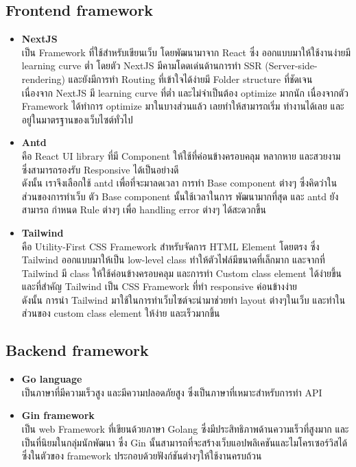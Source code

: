 \documentclass[12pt,oneside,openright,a4paper]{cpe-thai-project}
\begin{document}
\subsection{Frontend framework}
\begin{itemize}
  \item \textbf{NextJS} \\
\hspace*{1cm} เป็น Framework ที่ใช้สำหรับเขียนเว็บ โดยพัฒนามาจาก React ซึ่ง ออกแบบมาให้ใช้งานง่ายมี learning curve ต่ำ โดยตัว NextJS มีคามโดดเด่นด้านการทำ SSR (Server-side-rendering) และยังมีการทำ Routing ที่เข้าใจได้ง่ายมี Folder structure ที่ชัดเจน \\
\hspace*{1cm} เนื่องจาก NextJS มี learning curve ที่ต่ำ และไม่จำเป็นต้อง optimize มากนัก เนื่องจากตัว Framework ได้ทำการ optimize มาในบางส่วนแล้ว เลยทำให้สามารถเริ่ม ทำงานได้เลย และอยู่ในมาตรฐานของเว็บไซต์ทั่วไป
  \item \textbf{Antd} \\
\hspace*{1cm} คือ React UI library ที่มี  Component ให้ใช้ที่ค่อนข้างครอบคลุม หลากหาย และสวยงาม ซึ่งสามารถรองรับ Responsive ได้เป็นอย่างดี \\
\hspace*{1cm} ดังนั้น เราจึงเลือกใช้ antd เพื่อที่จะมาลดเวลา การทำ Base component ต่างๆ ซึ่งคิดว่าในส่วนของการทำเว็บ ตัว Base component นั้นใช้เวลาในการ พัฒนามากที่สุด และ antd ยังสามารถ กำหนด Rule ต่างๆ เพื่อ handling error ต่างๆ ได้สะดวกขึ้น
  \item \textbf{Tailwind} \\
\hspace*{1cm} คือ Utility-First CSS Framework สำหรับจัดการ HTML Element โดยตรง ซึ่ง Tailwind ออกแบบมาให้เป็น low-level class ทำให้ตัวไฟล์มีขนาดที่เล็กมาก และจากที่ Tailwind มี class ให้ใช้ค่อนข้างครอบคลุม และการทำ Custom class element ได้ง่ายขึ้น และที่สำคัญ Tailwind เป็น CSS Framework ที่ทำ responsive ค่อนข้างง่าย \\
\hspace*{1cm} ดังนั้น การนำ Tailwind มาใช้ในการทำเว็บไซต์จะนำมาช่วยทำ layout ต่างๆในเว็บ และทำในส่วนของ custom class element ให้ง่าย และเร็วมากขึ้น
\end{itemize}
\subsection{Backend framework}
\begin{itemize}
  \item \textbf{Go language} \\
  \hspace*{1cm} เป็นภาษาที่มีความเร็วสูง และมีความปลอดภัยสูง ซึ่งเป็นภาษาที่เหมาะสำหรับการทำ API 
  \item \textbf{Gin framework} \\
\hspace*{1cm} เป็น web Framework ที่เขียนด้วยภาษา Golang ซึ่งมีประสิทธิภาพด้านความเร็วที่สูงมาก และเป็นที่นิยมในกลุ่มนักพัฒนา ซึ่ง Gin นั้นสามารถที่จะสร้างเว็บแอปพลิเคชันและไมโครเซอร์วิสได้ ซึ่งในตัวของ framework ประกอบด้วยฟังก์ชันต่างๆให้ใช้งานครบถ้วน 
\end{itemize}
\end{document}
